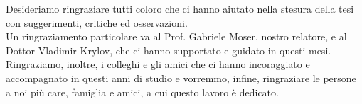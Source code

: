 
\italiano
\ringraziamenti

Desideriamo ringraziare tutti coloro che ci hanno aiutato nella stesura della tesi con suggerimenti, critiche ed osservazioni.\\
Un ringraziamento particolare va al Prof. Gabriele Moser, nostro relatore, e al Dottor Vladimir Krylov, che ci hanno supportato e guidato in questi mesi. \\
Ringraziamo, inoltre, i colleghi e gli amici che ci hanno incoraggiato e accompagnato in questi anni di studio e vorremmo, infine, ringraziare le persone a noi più care, famiglia e amici, a cui questo lavoro è dedicato.